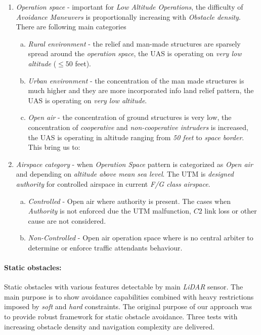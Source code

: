 \begin{enumerate}
    \item \emph{Operation space} - important for \emph{Low Altitude Operations}, the difficulty of \emph{Avoidance Maneuvers} is proportionally increasing with \emph{Obstacle density}. There are following main categories
    \begin{enumerate}[a.]
        \item \emph{Rural environment} - the relief and man-made structures are sparsely spread around the \emph{operation space}, the UAS is operating on \emph{very low altitude} ($\le 50$ feet).
        
        \item \emph{Urban environment} - the concentration of the man made structures is much higher and they are more incorporated info land relief pattern, the UAS is operating on \emph{very low altitude}.
        
        \item \emph{Open air} - the concentration of ground structures is very low, the concentration of \emph{cooperative} and \emph{non-cooperative intruders} is increased, the UAS is operating in altitude ranging from \emph{50 feet} to \emph{space border}. This bring us to:
    \end{enumerate}
    
    \item \emph{Airspace category} -  when \emph{Operation Space} pattern is categorized as \emph{Open air} and depending on \emph{altitude above mean sea level}. The UTM  is \emph{designed authority} for controlled airspace in current \emph{F/G class airspace}.
    \begin{enumerate}[a.]
        \item \emph{Controlled} - Open air where authority is present. The cases when \emph{Authority} is not enforced due the UTM malfunction, $C2$ link loss or other cause are not considered.
        
        \item \emph{Non-Controlled} - Open air operation space where is no central arbiter to determine or enforce traffic attendants behaviour.
        
    \end{enumerate}
\end{enumerate}

\paragraph{Static obstacles:}  Static obstacles with various features detectable by main \emph{LiDAR} sensor. The main purpose is to show avoidance capabilities combined with heavy restrictions imposed by \emph{soft} and \emph{hard} constraints. The original purpose of our approach was to provide robust framework for static obstacle avoidance. Three tests with increasing obstacle density and navigation complexity are delivered.
    
